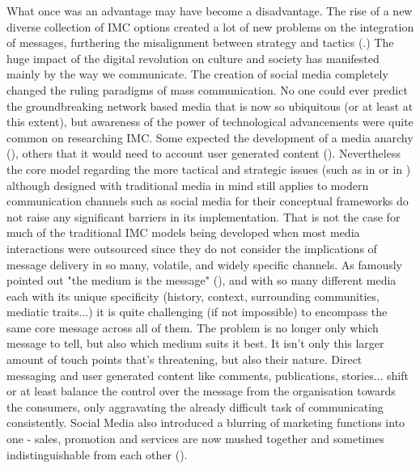 \documentclass[12pt]{article}
\begin{document}
What once was an advantage may have become a disadvantage. The rise of a new diverse collection of IMC options created a lot of new problems on the integration of messages, furthering the misalignment between strategy and tactics (\cite{holm}.) The huge impact of the digital revolution on culture and society has manifested mainly by the way we communicate. The creation of social media completely changed the ruling paradigms of mass communication. No one could ever predict the groundbreaking network based media that is now so ubiquitous (or at least at this extent), but awareness of the power of technological advancements were quite common on researching IMC. Some expected the development of a media anarchy (\cite{solomon}), others that it would need to account user generated content (\cite{ananda}). Nevertheless the core model regarding the more tactical and strategic issues (such as \citeauthor{schultz} in \citeyear{schultz} or \citeauthor{duncan} in \citeyear{duncan}) although designed with traditional media in mind still applies to modern communication channels such as social media for their conceptual frameworks do not raise any significant barriers in its implementation. That is not the case for much of the traditional IMC models being developed when most media interactions were outsourced since they do not consider the implications of message delivery in so many, volatile, and widely specific channels. As \citeauthor{mcluhan} famously pointed out "the medium is the message" (\citeyear{mcluhan}), and with so many different media each with its unique specificity (history, context, surrounding communities, mediatic traits...) it is quite challenging (if not impossible) to encompass the same core message across all of them. The problem is no longer only which message to tell, but also which medium suits it best. It isn't only this larger amount of touch points that's threatening, but also their nature. Direct messaging and user generated content like comments, publications, stories... shift or at least balance the control over the message from the organisation towards the consumers, only aggravating the already difficult task of communicating consistently. Social Media also introduced a blurring of marketing functions into one - sales, promotion and services are now mushed together and sometimes indistinguishable from each other (\cite{valos}).  
\end{document}

